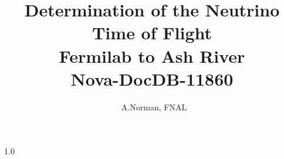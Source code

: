 \documentclass[letterpaper]{article}
\begin{document}
%
\newcommand{\bitlabel}[2]{%
  \bitbox[]{#1}{%
    \raisebox{0pt}[4ex][0pt]{%
      \turnbox{45}{\fontsize{7}{7}\selectfont#2}%
    }%
  }%
}%
%
\title{\bf Determination of the Neutrino Time of Flight\\Fermilab to
  Ash River\\Nova-DocDB-11860}
\author{~A.Norman, FNAL}
\maketitle
%
\newpage
%
\normalsize                     %
\begin{spacing}{1.0}            %

\clearpage
\newpage


%
%
%
%
\end{spacing}
%
\newpage
%

%
%
\end{document}
